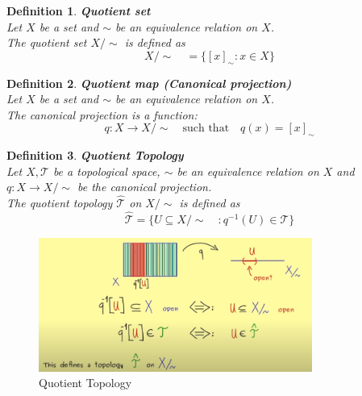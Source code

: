 \documentclass[11pt]{book} %
\newtheorem{definition}{Definition}[section]
\begin{document}
\begin{definition}{\textbf{Quotient set}} \\
    Let \( X \) be a set and \( \sim \) be an equivalence relation on \( X \). \\
    The quotient set \( X / \sim \) is defined as 
    \begin{equation*}
        X/\sim \quad = \{ [x]_\sim : x \in X \}
    \end{equation*}
\end{definition}

\begin{definition}{\textbf{Quotient map (Canonical projection)}} \\
    Let \( X \) be a set and \( \sim \) be an equivalence relation on \( X \). \\
    The canonical projection is a function:
    \begin{equation*}
        q: X \to X/\sim \quad \text{such that} \quad q(x) = [x]_\sim
    \end{equation*}
\end{definition}

\begin{definition}{\textbf{Quotient Topology}} \\
    Let \( X , \mathcal{T} \) be a topological space, \( \sim \) be an equivalence relation on \( X \) and \( q: X \to X/\sim \) be the canonical projection. \\
    The quotient topology \( \hat{\mathcal{T}} \) on \( X/\sim \) is defined as
    \begin{equation*}
        \hat{\mathcal{T}} = \{ U \subseteq X/\sim \quad : q^{-1}(U) \in \mathcal{T} \}
    \end{equation*}
\end{definition}

\begin{figure}[H]
    \centering
    \includegraphics[width=0.8\textwidth]{Figs/quotient_topology.png}
    \caption{Quotient Topology}
\end{figure}
\end{document}
